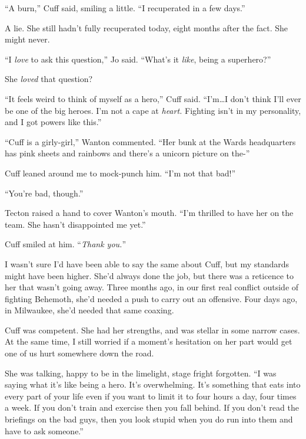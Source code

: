 ``A burn,'' Cuff said, smiling a little.  ``I recuperated in a few days.''



A lie.  She still hadn't fully recuperated today, eight months after the fact.  She might never.



``I \emph{love} to ask this question,'' Jo said.  ``What's it \emph{like}, being a superhero?''



She \emph{loved} that question?



``It feels weird to think of myself as a hero,'' Cuff said.  ``I'm\ldots I don't think I'll ever be one of the big heroes.  I'm not a cape at \emph{heart.}  Fighting isn't in my personality, and I got powers like this.''



``Cuff is a girly-girl,'' Wanton commented.  ``Her bunk at the Wards headquarters has pink sheets and rainbows and there's a unicorn picture on the-''



Cuff leaned around me to mock-punch him.  ``I'm not that bad!''



``You're bad, though.''



Tecton raised a hand to cover Wanton's mouth.  ``I'm thrilled to have her on the team.  She hasn't disappointed me yet.''



Cuff smiled at him.  ``\emph{Thank you.}''



I wasn't sure I'd have been able to say the same about Cuff, but my standards might have been higher.  She'd always done the job, but there was a reticence to her that wasn't going away.  Three months ago, in our first real conflict outside of fighting Behemoth, she'd needed a push to carry out an offensive.  Four days ago, in Milwaukee, she'd needed that same coaxing.



Cuff was competent.  She had her strengths, and was stellar in some narrow cases.  At the same time, I still worried if a moment's hesitation on her part would get one of us hurt somewhere down the road.



She was talking, happy to be in the limelight, stage fright forgotten.  ``I was saying what it's like being a hero.  It's overwhelming.  It's something that eats into every part of your life even if you want to limit it to four hours a day, four times a week.  If you don't train and exercise then you fall behind.  If you don't read the briefings on the bad guys, then you look stupid when you do run into them and have to ask someone.''



